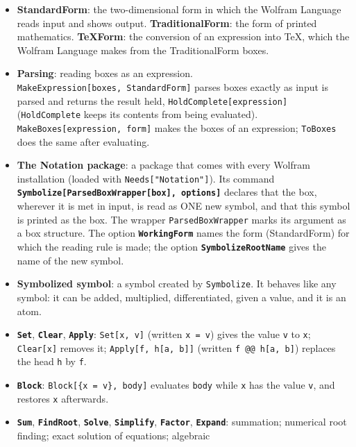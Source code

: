 \documentclass[
  10pt,
]{article}
\begin{document}
\begin{itemize}
  change the appearance.
\item
  \textbf{StandardForm}: the two-dimensional form in which the Wolfram
  Language reads input and shows output. \textbf{TraditionalForm}: the
  form of printed mathematics. \textbf{TeXForm}: the conversion of an
  expression into TeX, which the Wolfram Language makes from the
  TraditionalForm boxes.
\item
  \textbf{Parsing}: reading boxes as an expression.
  \texttt{MakeExpression{[}boxes,\ StandardForm{]}} parses boxes exactly
  as input is parsed and returns the result held,
  \texttt{HoldComplete{[}expression{]}} (\texttt{HoldComplete} keeps its
  contents from being evaluated).
  \texttt{MakeBoxes{[}expression,\ form{]}} makes the boxes of an
  expression; \texttt{ToBoxes} does the same after evaluating.
\item
  \textbf{The Notation package}: a package that comes with every Wolfram
  installation (loaded with
  \texttt{Needs{[}"Notation\textasciigrave{}"{]}}). Its command
  \textbf{\texttt{Symbolize{[}ParsedBoxWrapper{[}box{]},\ options{]}}}
  declares that the box, wherever it is met in input, is read as ONE new
  symbol, and that this symbol is printed as the box. The wrapper
  \texttt{ParsedBoxWrapper} marks its argument as a box structure. The
  option \textbf{\texttt{WorkingForm}} names the form (StandardForm) for
  which the reading rule is made; the option
  \textbf{\texttt{SymbolizeRootName}} gives the name of the new symbol.
\item
  \textbf{Symbolized symbol}: a symbol created by \texttt{Symbolize}. It
  behaves like any symbol: it can be added, multiplied, differentiated,
  given a value, and it is an atom.
\item
  \textbf{\texttt{Set}}, \textbf{\texttt{Clear}},
  \textbf{\texttt{Apply}}: \texttt{Set{[}x,\ v{]}} (written
  \texttt{x\ =\ v}) gives the value \texttt{v} to \texttt{x};
  \texttt{Clear{[}x{]}} removes it; \texttt{Apply{[}f,\ h{[}a,\ b{]}{]}}
  (written \texttt{f\ @@\ h{[}a,\ b{]}}) replaces the head \texttt{h} by
  \texttt{f}.
\item
  \textbf{\texttt{Block}}: \texttt{Block{[}\{x\ =\ v\},\ body{]}}
  evaluates \texttt{body} while \texttt{x} has the value \texttt{v}, and
  restores \texttt{x} afterwards.
\item
  \textbf{\texttt{Sum}}, \textbf{\texttt{FindRoot}},
  \textbf{\texttt{Solve}}, \textbf{\texttt{Simplify}},
  \textbf{\texttt{Factor}}, \textbf{\texttt{Expand}}: summation;
  numerical root finding; exact solution of equations; algebraic

\end{itemize}
\end{document}
